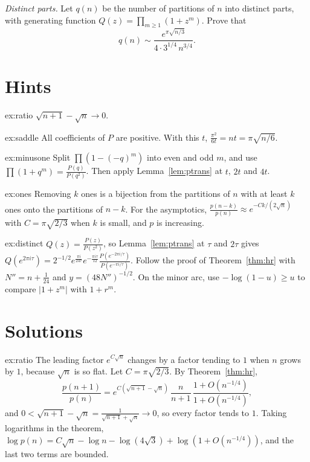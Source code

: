 \begin{exercise}[$\star\star\star$]\label{ex:distinct}
\emph{Distinct parts.} Let $q(n)$ be the number of partitions of $n$ into distinct parts, with generating function $Q(z)=\prod_{m\ge1}(1+z^m)$. Prove that
\[
q(n)\sim\frac{e^{\pi\sqrt{n/3}}}{4\cdot3^{1/4}\,n^{3/4}}.
\]
\end{exercise}

\section{Hints}

\begin{hint}{ex:ratio}
$\sqrt{n+1}-\sqrt n\to0$.
\end{hint}

\begin{hint}{ex:saddle}
All coefficients of $P$ are positive. With this $t$, $\frac{\pi^2}{6t}=nt=\pi\sqrt{n/6}$.
\end{hint}

\begin{hint}{ex:minusone}
Split $\prod(1-(-q)^m)$ into even and odd $m$, and use $\prod(1+q^m)=\frac{P(q)}{P(q^2)}$. Then apply Lemma~\ref{lem:ptrans} at $t$, $2t$ and $4t$.
\end{hint}

\begin{hint}{ex:ones}
Removing $k$ ones is a bijection from the partitions of $n$ with at least $k$ ones onto the partitions of $n-k$. For the asymptotics, $\frac{p(n-k)}{p(n)}\approx e^{-Ck/(2\sqrt n)}$ with $C=\pi\sqrt{2/3}$ when $k$ is small, and $p$ is increasing.
\end{hint}

\begin{hint}{ex:distinct}
$Q(z)=\frac{P(z)}{P(z^2)}$, so Lemma~\ref{lem:ptrans} at $\tau$ and $2\tau$ gives $Q(e^{2\pi i\tau})=2^{-1/2}e^{\frac{\pi i}{24\tau}}e^{-\frac{\pi i\tau}{12}}\frac{P(e^{-2\pi i/\tau})}{P(e^{-\pi i/\tau})}$. Follow the proof of Theorem~\ref{thm:hr} with $N''=n+\frac1{24}$ and $y=(48N'')^{-1/2}$. On the minor arc, use $-\log(1-u)\ge u$ to compare $|1+z^m|$ with $1+r^m$.
\end{hint}

\section{Solutions}

\begin{solution}{ex:ratio}
\idea The leading factor $e^{C\sqrt n}$ changes by a factor tending to $1$ when $n$ grows by $1$, because $\sqrt n$ is so flat.
\writeup Let $C=\pi\sqrt{2/3}$. By Theorem~\ref{thm:hr},
\[
\frac{p(n+1)}{p(n)}=e^{C(\sqrt{n+1}-\sqrt n)}\,\frac n{n+1}\,\frac{1+O(n^{-1/4})}{1+O(n^{-1/4})},
\]
and $0<\sqrt{n+1}-\sqrt n=\frac1{\sqrt{n+1}+\sqrt n}\to0$, so every factor tends to $1$. Taking logarithms in the theorem, $\log p(n)=C\sqrt n-\log n-\log(4\sqrt3)+\log(1+O(n^{-1/4}))$, and the last two terms are bounded.
\end{solution}

